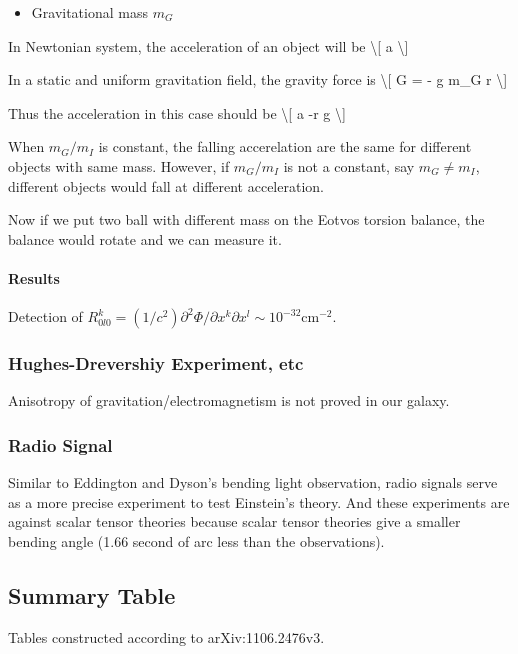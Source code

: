 \documentclass[letterpaper,10pt,english]{sphinxmanual}
\begin{document}
{\begin{itemize}
\item {} 
Gravitational mass $m_G$

\end{itemize}

In Newtonian system, the acceleration of an object will be \textbackslash{}{[} a \textbackslash{}{]}

In a static and uniform gravitation field, the gravity force is \textbackslash{}{[} G =
- g m\_G r \textbackslash{}{]}

Thus the acceleration in this case should be \textbackslash{}{[} a -r g \textbackslash{}{]}

When $m_G/m_I$ is constant, the falling accerelation are the same
for different objects with same mass. However, if $m_G/m_I$ is not
a constant, say $m_G\ne m_I$, different objects would fall at
different acceleration.

Now if we put two ball with different mass on the Eotvos torsion
balance, the balance would rotate and we can measure it.


\paragraph{Results}
\label{GeneralRelativityAdv:results}
Detection of
$R^k_{0l0}=(1/c^2)\partial^2\Phi/\partial x^k\partial x^l \sim 10^{-32} \text{cm}^{-2}$.


\subsubsection{Hughes-Drevershiy Experiment, etc}
\label{GeneralRelativityAdv:hughes-drevershiy-experiment-etc}
Anisotropy of gravitation/electromagnetism is not proved in our galaxy.


\subsubsection{Radio Signal}
\label{GeneralRelativityAdv:radio-signal}
Similar to Eddington and Dyson's bending light observation, radio
signals serve as a more precise experiment to test Einstein's theory.
And these experiments are against scalar tensor theories because scalar
tensor theories give a smaller bending angle (1.66 second of arc less
than the observations).


\subsection{Summary Table}
\label{GeneralRelativityAdv:summary-table}
Tables constructed according to arXiv:1106.2476v3.

}
\end{document}
